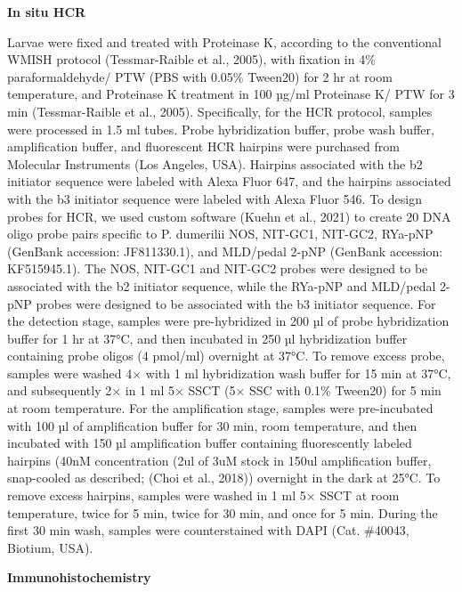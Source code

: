 \documentclass[
  10pt,
  onecolumn]{article}
\begin{document}
\textbf{In situ HCR}

Larvae were fixed and treated with Proteinase K, according to the
conventional WMISH protocol (Tessmar-Raible et al., 2005), with fixation
in 4\% paraformaldehyde/ PTW (PBS with 0.05\% Tween20) for 2 hr at room
temperature, and Proteinase K treatment in 100 µg/ml Proteinase K/ PTW
for 3 min (Tessmar-Raible et al., 2005). Specifically, for the HCR
protocol, samples were processed in 1.5 ml tubes. Probe hybridization
buffer, probe wash buffer, amplification buffer, and fluorescent HCR
hairpins were purchased from Molecular Instruments (Los Angeles, USA).
Hairpins associated with the b2 initiator sequence were labeled with
Alexa Fluor 647, and the hairpins associated with the b3 initiator
sequence were labeled with Alexa Fluor 546. To design probes for HCR, we
used custom software (Kuehn et al., 2021) to create 20 DNA oligo probe
pairs specific to P. dumerilii NOS, NIT-GC1, NIT-GC2, RYa-pNP (GenBank
accession: JF811330.1), and MLD/pedal 2-pNP (GenBank accession:
KF515945.1). The NOS, NIT-GC1 and NIT-GC2 probes were designed to be
associated with the b2 initiator sequence, while the RYa-pNP and
MLD/pedal 2-pNP probes were designed to be associated with the b3
initiator sequence. For the detection stage, samples were pre-hybridized
in 200 µl of probe hybridization buffer for 1 hr at 37°C, and then
incubated in 250 µl hybridization buffer containing probe oligos (4
pmol/ml) overnight at 37°C. To remove excess probe, samples were washed
4× with 1 ml hybridization wash buffer for 15 min at 37°C, and
subsequently 2× in 1 ml 5× SSCT (5× SSC with 0.1\% Tween20) for 5 min at
room temperature. For the amplification stage, samples were
pre-incubated with 100 µl of amplification buffer for 30 min, room
temperature, and then incubated with 150 µl amplification buffer
containing fluorescently labeled hairpins (40nM concentration (2ul of
3uM stock in 150ul amplification buffer, snap-cooled as described; (Choi
et al., 2018)) overnight in the dark at 25°C. To remove excess hairpins,
samples were washed in 1 ml 5× SSCT at room temperature, twice for 5
min, twice for 30 min, and once for 5 min. During the first 30 min wash,
samples were counterstained with DAPI (Cat. \#40043, Biotium, USA).

\textbf{Immunohistochemistry}
\end{document}
